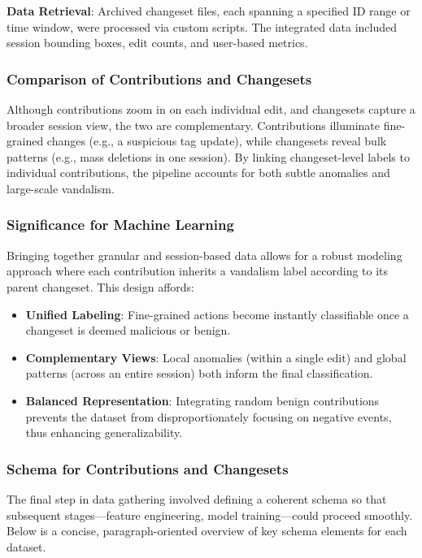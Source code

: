 \documentclass[
    13pt, %
    a4paper, %
    twoside, 
    DIV14, %
    listof=totoc, %
    bibliography=totoc, %
    index=totoc, %
    headsepline
]{scrreprt}
\begin{document}
\noindent
\textbf{Data Retrieval}:  
Archived changeset files, each spanning a specified ID range or time window, were processed via custom scripts. The integrated data included session bounding boxes, edit counts, and user-based metrics. 

\subsubsection{Comparison of Contributions and Changesets}
\noindent
Although contributions zoom in on each individual edit, and changesets capture a broader session view, the two are complementary. Contributions illuminate fine-grained changes (e.g., a suspicious tag update), while changesets reveal bulk patterns (e.g., mass deletions in one session). By linking changeset-level labels to individual contributions, the pipeline accounts for both subtle anomalies and large-scale vandalism.

\subsubsection{Significance for Machine Learning}
\noindent
Bringing together granular and session-based data allows for a robust modeling approach where each contribution inherits a vandalism label according to its parent changeset. This design affords:
\begin{itemize}
    \item \textbf{Unified Labeling}: Fine-grained actions become instantly classifiable once a changeset is deemed malicious or benign.
    \item \textbf{Complementary Views}: Local anomalies (within a single edit) and global patterns (across an entire session) both inform the final classification.
    \item \textbf{Balanced Representation}: Integrating random benign contributions prevents the dataset from disproportionately focusing on negative events, thus enhancing generalizability.
\end{itemize}

\subsubsection{Schema for Contributions and Changesets}

The final step in data gathering involved defining a coherent schema so that subsequent stages—feature engineering, model training—could proceed smoothly. Below is a concise, paragraph-oriented overview of key schema elements for each dataset.
\end{document}
